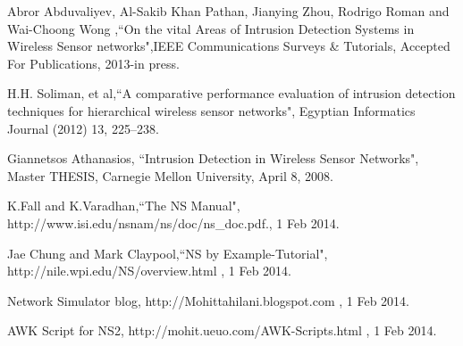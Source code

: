 \begin{thebibliography}{}

Abror Abduvaliyev, Al-Sakib Khan Pathan, Jianying Zhou, Rodrigo Roman and Wai-Choong Wong ,``On the vital Areas of Intrusion Detection Systems in Wireless Sensor networks",IEEE Communications Surveys \& Tutorials, Accepted For Publications, 2013-in press.

H.H. Soliman, et al,``A comparative performance evaluation of intrusion detection techniques for hierarchical wireless sensor networks", Egyptian Informatics Journal (2012) 13, 225–238. 


Giannetsos Athanasios, ``Intrusion Detection in Wireless Sensor Networks", Master THESIS, Carnegie Mellon University, April 8, 2008. 

K.Fall and K.Varadhan,``The NS Manual",
http://www.isi.edu/nsnam/ns/doc/ns\_doc.pdf., 1 Feb 2014.

Jae Chung and Mark Claypool,``NS by Example-Tutorial",
http://nile.wpi.edu/NS/overview.html , 1 Feb 2014.

Network Simulator blog,
http://Mohittahilani.blogspot.com , 1 Feb 2014.

AWK Script for NS2,
http://mohit.ueuo.com/AWK-Scripts.html , 1 Feb 2014.

\end{thebibliography}
